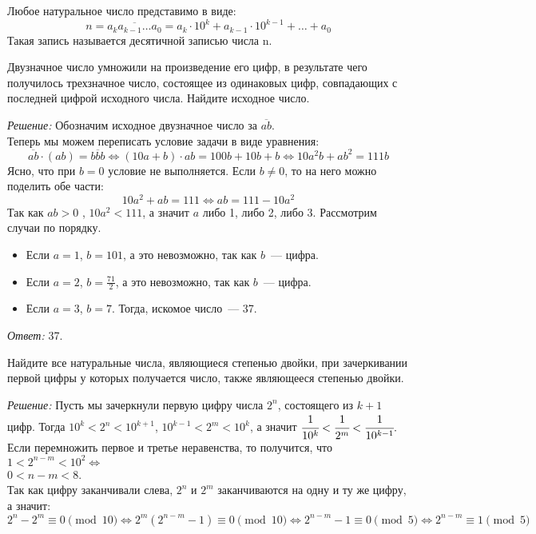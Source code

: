 \documentclass[11pt]{article}
\begin{document}
\begin{definition}
    Любое натуральное число представимо в виде:
\[ n = \overline{a_{k}a_{k - 1}\ldots a_0} = a_k \cdot 10^k + a_{k - 1} \cdot 10^{k -1} + \ldots + a_0 \]
Такая запись называется десятичной записью числа n.
\end{definition}

\begin{example}
	Двузначное число умножили на произведение его цифр, в результате чего получилось трехзначное число, состоящее из одинаковых цифр, совпадающих с последней цифрой исходного числа. Найдите исходное число.
\end{example}
\textit{Решение:}
Обозначим исходное двузначное число за $\overline{ab}$.\\
Теперь мы можем переписать условие задачи в виде уравнения:
\[ \overline{ab} \cdot (ab) = \overline{bbb} \Leftrightarrow
(10a + b) \cdot ab = 100b + 10b + b \Leftrightarrow
10a^2b + ab^2 = 111b \]
Ясно, что при $b = 0$ условие не выполняется. Если $b \neq 0$, то на него можно поделить обе части:
\[10a^2 + ab = 111 \Leftrightarrow ab = 111 - 10a^2\]
Так как $ab > 0$ , $10a^2 < 111$, а значит $a$ либо 1, либо 2, либо 3. Рассмотрим случаи по порядку.
\begin{itemize}
	\item Если $a = 1$, $b = 101$, а это невозможно, так как $b$~--- цифра.
	\item Если $a = 2$, $b = \frac{71}{2}$, а это невозможно, так как $b$~--- цифра.
	\item Если $a = 3$, $b = 7$. Тогда, искомое число~--- 37.
\end{itemize}
\textit{Ответ:} 37.

\begin{example}
	Найдите все натуральные числа, являющиеся степенью двойки, при зачеркивании первой цифры у которых получается число, также являющееся степенью двойки.
\end{example}
\textit{Решение:}
Пусть мы зачеркнули первую цифру числа $2^n$, состоящего из $k + 1$ цифр. Тогда  $10^k < 2^n < 10^{k + 1}$, $10^{k - 1} < 2^m < 10^k$, а значит $\cfrac{1}{10^k} < \cfrac{1}{2^m} < \cfrac{1}{10^{k - 1}}.$\\
Если перемножить первое и третье неравенства, то получится, что $1 < 2^{n - m} < 10^{2} \Longleftrightarrow$\\ $0 < n - m < 8$.\\
Так как цифру заканчивали слева, $2^n$ и $2^m$ заканчиваются на одну и ту же цифру, а значит:\\
\[2^n - 2^m \equiv 0 \pmod{10} \Leftrightarrow 2^m(2^{n - m} - 1) \equiv 0 \pmod{10} \Leftrightarrow
2^{n - m} - 1 \equiv 0 \pmod 5 \Leftrightarrow 2^{n - m} \equiv 1 \pmod 5 \]
\end{document}
